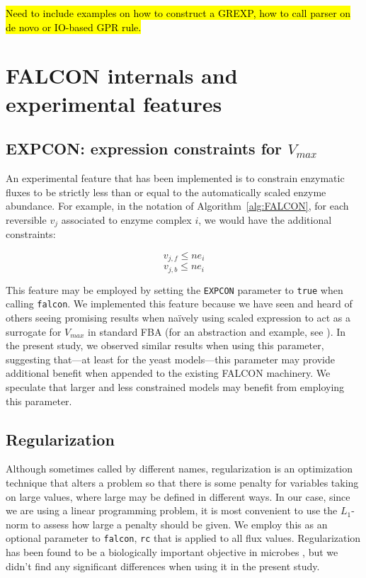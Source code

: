 \hl{Need to include examples on how to construct a GREXP, how to call
parser on de novo or IO-based GPR rule.}

\section{FALCON internals and experimental features}
\label{sec:internals}

\subsection{EXPCON: expression constraints for $V_{max}$}
An experimental feature that has been implemented is to constrain
enzymatic fluxes to be strictly less than or equal to the
automatically scaled enzyme abundance. For example, in the
notation of Algorithm~\ref{alg:FALCON}, for each reversible $v_j$
associated to enzyme complex $i$, we would have the additional
constraints:

\[ v_{j,f} \leq n e_i \]
\[ v_{j,b} \leq n e_i \]

This feature may be employed by setting the \texttt{EXPCON} parameter
to \texttt{true} when calling \texttt{falcon}. We implemented this
feature because we have seen and heard of others seeing promising
results when na\"ively using scaled expression to act as a surrogate for
$V_{max}$ in standard FBA (for an abstraction and example, see
\citealt{Colijn2009}). In the present study, we observed similar
results when using this parameter, suggesting that---at least for the
yeast models---this parameter may provide additional benefit when
appended to the existing FALCON machinery. We speculate that larger
and less constrained models may benefit from employing this parameter.

\subsection{Regularization}
Although sometimes called by different names, regularization is an
optimization technique that alters a problem so that there is some
penalty for variables taking on large values, where large may be
defined in different ways. In our case, since we are using a linear
programming problem, it is most convenient to use the $L_1$-norm to
assess how large a penalty should be given. We employ this as an
optional parameter to \texttt{falcon}, \texttt{rc} that is applied to
all flux values.  Regularization has been found to be a biologically
important objective in microbes \citep{Schuetz2012}, but we didn't
find any significant differences when using it in the present study.


